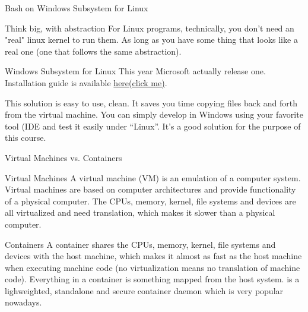 \begin{frame}{Bash on Windows Subsystem for Linux}
\begin{block}{Think big, with abstraction}
	For Linux programs, technically, you don't need an "real" linux kernel to run them. As long as you have some thing that looks like a real one (one that follows the same abstraction). 
\end{block}
\begin{block}{Windows Subsystem for Linux}
	This year Microsoft actually release one. Installation guide is available \href{https://msdn.microsoft.com/zh-cn/commandline/wsl/install\_guide}{here(click me)}.
	
	This solution is easy to use, clean. It saves you time copying files back and forth from the virtual machine. You can simply develop in Windows using your favorite tool (IDE and test it easily under ``Linux''. It's a good solution for the purpose of this course.
\end{block}
\end{frame}

\begin{frame}{Virtual Machines vs. Containers}
\begin{block}{Virtual Machines}
	A virtual machine (VM) is an emulation of a computer system. Virtual machines are based on computer architectures and provide functionality of a physical computer. The CPUs, memory, kernel, file systems and devices are all virtualized and need translation, which makes it slower than a physical computer.
\end{block}
\begin{block}{Containers}
	A container shares the CPUs, memory, kernel, file systems and devices with the host machine, which makes it almost as fast as the host machine when executing machine code (no virtualization means no translation of machine code). Everything in a container is something mapped from the host system.  is a lighweighted, standalone and secure container daemon which is very popular nowadays.
\end{block}
\end{frame}

